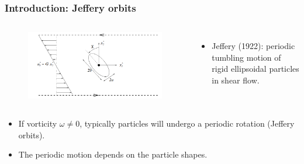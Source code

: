 \documentclass{beamer}
\newcommand{\bi}{\begin{itemize}}
\newcommand{\ei}{\end{itemize}}
\begin{document}
\begin{frame}
	\frametitle{Introduction: Jeffery orbits}
	\begin{overlayarea}{\textwidth}{\textheight}
		\vspace{-0.2cm}
	\begin{columns}
	\begin{figure}[htb]
		\begin{center}
			\includegraphics[width=1\textwidth]{plots/jeffery.png}
		\end{center}
	\end{figure}
	\small
	\bi
	\item Jeffery (1922): periodic tumbling motion of rigid ellipsoidal particles in shear flow.
	\ei 
\end{columns}
\vspace{0.5cm}
\bi 
\item If vorticity $\omega\neq 0$, typically particles will undergo a periodic rotation (Jeffery orbits).
	\item The periodic motion depends on the particle shapes.
\ei
	\end{overlayarea}
\end{frame}


\end{document}
